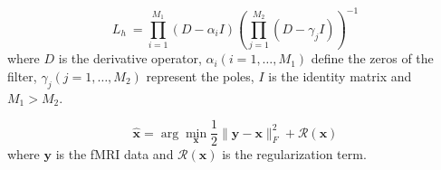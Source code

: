 \begin{equation}
    L_h\ = \prod_{i=1}^{M_1} (D-\alpha_i I) (\prod_{j=1}^{M_2} (D - \gamma_j I))^{-1}
\end{equation}
where \(D\) is the derivative operator, \(\alpha_i (i=1, \hdots, M_1)\) define the zeros of the filter, \(\gamma_j (j=1, \hdots, M_2)\) represent the poles, \(I\) is the identity matrix and \(M_1 > M_2\).

\begin{equation}
    \hat{\mathbf{x}} = \arg \min_{\mathbf{x}} \frac{1}{2} \| \mathbf{y} - \mathbf{x} \|_F^2 + \mathcal{R}(\mathbf{x})
\end{equation}
where \(\mathbf{y}\) is the fMRI data and \(\mathcal{R}(\mathbf{x})\) is the regularization term.